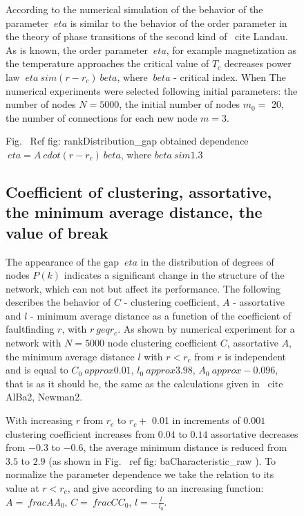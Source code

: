 \documentclass[10pt,aps,pra]{revtex4-1}
\begin{document}
\begin{figure}[H]
According to the numerical simulation of the behavior of the parameter $ \ eta $ is similar to the behavior of the order parameter in the theory of phase transitions of the second kind of \ cite {Landau}. As is known, the order parameter $ \ eta $, for example magnetization as the temperature approaches the critical value of $ T_c $ decreases power law $ \ eta \ sim (r-r_c) ^ \ beta $, where $ \ beta $ - critical index.
When The numerical experiments were selected following initial parameters: the number of nodes $ N = 5000 $, the initial number of nodes $ m_0 = $ 20, the number of connections for each new node $ m = 3 $.

Fig. \ Ref {fig: rankDistribution_gap} obtained dependence $ \ eta = A \ cdot {(r-r_c)} ^ \ beta $, where $  beta \ sim 1.3 $ \

\subsection {Coefficient of clustering, assortative, the minimum average distance, the value of break}
The appearance of the gap $ \ eta $ in the distribution of degrees of nodes $ P (k) $ indicates a significant change in the structure of the network, which can not but affect its performance. The following describes the behavior of $ C $ - clustering coefficient, $ A $ - assortative and $ l $ - minimum average distance as a function of the coefficient of faultfinding $ r $, with $ r \ geq r_c $. As shown by numerical experiment for a network with $ N = 5000 $ node clustering coefficient $ C $, assortative $ A $, the minimum average distance $ l $ with $ r <r_c $ from $ r $ is independent and is equal to $ C_0 \ approx 0.01 $, $ l_0 \ approx 3.98 $, $ A_0 \ approx -0.096 $, that is as it should be, the same as the calculations given in \ cite {AlBa2, Newman2}.

With increasing $ r $ from $ r_c $ to $ r_c + $ 0.01 in increments of $ 0.001 $ clustering coefficient increases from $ 0.04 $ to $ 0.14 $ assortative decreases from $ -0.3 $ to $ -0.6 $, the average minimum distance is reduced from $ 3.5 $ to $ 2.9 $ (as shown in Fig. \ ref {fig: baCharacteristic_raw} ). To normalize the parameter dependence we take the relation to its value at $ r <r_c $, and give according to an increasing function: $ A = \ frac {A} {A_0} $, $ C = \ frac {C} {C_0} $, $l=-\frac{l}{l_0}$.

\begin{figure}[H]  


\end{figure}
\end{figure}
\end{document}
